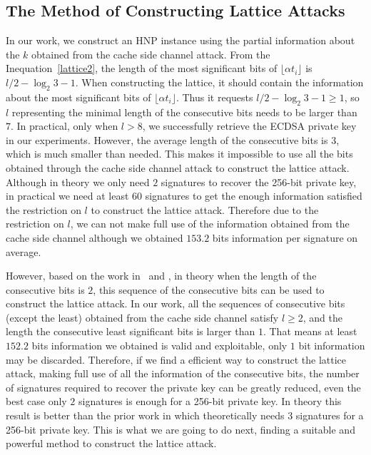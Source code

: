 \subsection{The Method of Constructing Lattice Attacks}
In our work, we construct an HNP instance using the partial information about the $k$ obtained from the cache side channel attack.
 From the Inequation~\ref{lattice2}, the length of the most significant bits of $\lfloor\alpha t_i\rfloor$ is $l/2-\log_{2}{3} -1$.
When constructing the lattice, it should contain the information about the most significant bits of $\lfloor\alpha t_i\rfloor$.
Thus it requests $l/2-\log_{2}{3} -1 \geq 1$, so $l$ representing the minimal length of the consecutive bits needs to be larger than $7$.
In practical, only when $l > 8$, we successfully retrieve the ECDSA private key in our experiments.
However, the average length of the consecutive bits is $3$, which is much smaller than needed.
This makes it impossible to use all the bits obtained through the cache side channel attack  to construct the lattice attack.
Although in theory we only need $2$ signatures to recover the 256-bit private key,
 in practical we need at least $60$ signatures to get the enough information satisfied the restriction on $l$ to construct the lattice attack.
Therefore due to the restriction on $l$, we can not make full use of the information obtained from the cache side channel although we obtained $153.2$ bits information per signature on average.

However, based on the work in~\cite{Nguyen2002} and \cite{Liu2013},
 in theory when the length of the consecutive bits is $2$, this sequence of  the consecutive bits can be used to construct the lattice attack.
In our work, all the sequences of consecutive bits (except the least) obtained from the cache side channel satisfy $l \geq 2$,
 and the length the consecutive least significant bits is larger than $1$.
 That means at least $152.2$ bits information we obtained is valid and exploitable, only $1$ bit information may be discarded.
Therefore, if we find a efficient way to construct the lattice attack, making full use of all the information of the consecutive bits,
   the number of signatures required to recover the private key can be greatly reduced, even the best case only $2$ signatures is enough for a 256-bit private key.
In theory this result is better than the prior work in \cite{Fan2016} which theoretically needs 3 signatures for a 256-bit private key.
This is what we are going to do next, finding a suitable and powerful method to construct the lattice attack.

